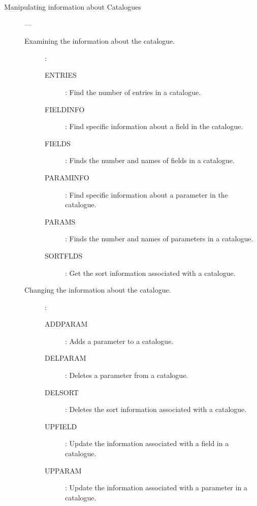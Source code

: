 \begin{description}
\begin{description}
\end{description}

\item [Manipulating information about Catalogues] ---

\begin{description}

\item [Examining the information about the catalogue.]:

\begin {description}

\item [ENTRIES]:
 Find the number of entries in a catalogue.

\item [FIELDINFO]:
 Find specific information about a field in the catalogue.

\item [FIELDS]:
 Finds the number and names of fields in a catalogue.

\item [PARAMINFO]:
 Find specific information about a parameter in the catalogue.

\item [PARAMS]:
 Finds the number and names of parameters in a catalogue.

\item [SORTFLDS]:
 Get the sort information associated with a catalogue.

\end{description}

\item [Changing the information about the catalogue.] :

\begin{description}

\item [ADDPARAM]:
 Adds a parameter to a catalogue.

\item [DELPARAM]:
 Deletes a parameter from a catalogue.

\item [DELSORT]:
 Deletes the sort information associated with a catalogue.

\item [UPFIELD]:
 Update the information associated with a field in a catalogue.

\item [UPPARAM]:
 Update the information associated with a parameter in a catalogue.

\end{description}


\end{description}
\end{description}
